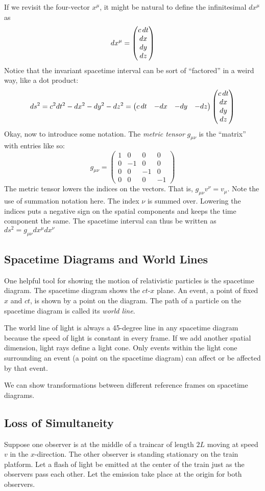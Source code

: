 If we revisit the four-vector $x^\mu$, it might be natural to define the infinitesimal $dx^\mu$ as 
\[
    dx^\mu = \begin{pmatrix} c \, dt \\ dx \\ dy \\ dz \end{pmatrix}
\]
Notice that the invariant spacetime interval can be sort of ``factored'' in a weird way, like a dot product: 
\[
    ds^2 = c^2 dt^2 - dx^2 - dy^2 - dz^2 = \begin{pmatrix}
        c\, dt & -dx & -dy & -dz
    \end{pmatrix} \begin{pmatrix} c \, dt \\ dx \\ dy \\ dz \end{pmatrix} 
\]
Okay, now to introduce some notation. The \textit{metric tensor} $g_{\mu \nu}$ is the ``matrix'' with entries like so: 
\[
    g_{\mu \nu} = \begin{pmatrix}
        1 & 0 & 0 & 0 \\
        0 & -1 & 0 & 0 \\
        0 & 0 & -1 & 0 \\
        0 & 0 & 0 & -1 
    \end{pmatrix}
\]  
The metric tensor lowers the indices on the vectors. That is, $g_{\mu \nu} v^{\nu} = v_{\mu}$. Note the use of summation notation here. The index $\nu$ is summed over. Lowering the indices puts a negative sign on the spatial components and keeps the time component the same.
The spacetime interval can thus be written as $ds^2 = g_{\mu \nu} dx^\mu dx^\nu$
\subsection{Spacetime Diagrams and World Lines}
One helpful tool for showing the motion of relativistic particles is the spacetime diagram. The spacetime diagram shows the $ct$-$x$ plane. An event, a point of fixed $x$ and $ct$, is shown by a point on the diagram. The path of a particle on the spacetime diagram is called its \textit{world line}. 

The world line of light is always a 45-degree line in any spacetime diagram because the speed of light is constant in every frame. If we add another spatial dimension, light rays define a light cone. Only events within the light cone surrounding an event (a point on the spacetime diagram) can affect or be affected by that event.

We can show transformations between different reference frames on spacetime diagrams.

\subsection{Loss of Simultaneity} Suppose one observer is at the middle of a traincar of length $2L$ moving at speed $v$ in the $x$-direction. The other observer is standing stationary on the train platform. Let a flash of light be emitted at the center of the train just as the observers pass each other. Let the emission take place at the origin for both observers.

